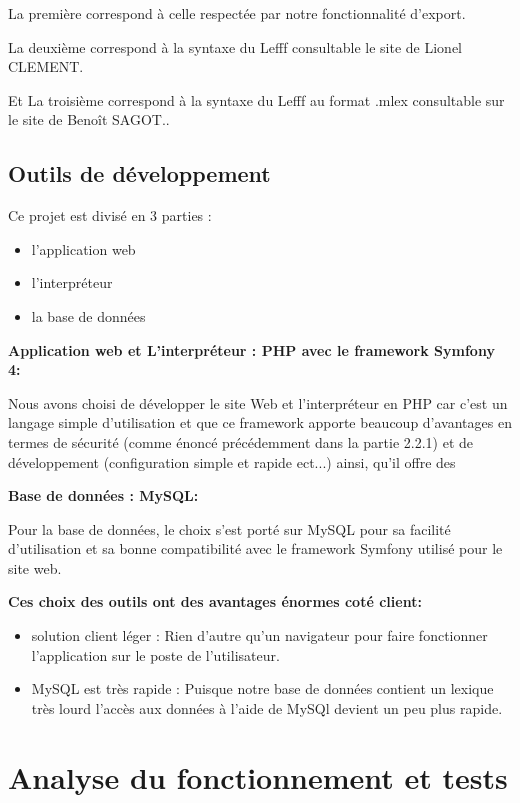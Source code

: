 \documentclass[12pt,a4paper]{article}
\begin{document}
La  première correspond à celle respectée par notre fonctionnalité d'export.




La deuxième  correspond à la syntaxe du Lefff consultable le site de Lionel CLEMENT.



Et La troisième  correspond à la syntaxe du Lefff au format .mlex consultable sur le site de Benoît SAGOT..

						

\subsection{Outils de développement}

Ce projet est divisé en 3 parties :
\begin{itemize}  
  \item l'application web
  \item l'interpréteur
  \item la base de données
\end{itemize}

\textbf{Application web et L'interpréteur : PHP avec le framework Symfony 4:}

Nous avons choisi de développer le site Web et l'interpréteur en PHP car c'est un langage simple d'utilisation et que ce framework apporte beaucoup d'avantages en termes de sécurité (comme énoncé précédemment dans la partie 2.2.1) et de développement (configuration simple et rapide ect...) ainsi, qu'il offre des 

\smallbreak

\textbf{Base de données : MySQL:}


Pour la base de données, le choix s'est porté sur MySQL pour sa facilité d'utilisation et sa bonne compatibilité avec le framework Symfony utilisé pour le site web. 


\textbf{Ces choix des outils ont des avantages énormes coté client:}

\begin{itemize}  
  \item solution client léger : Rien d'autre qu'un navigateur pour faire fonctionner l'application sur le poste de l'utilisateur.
  \item MySQL est très rapide : Puisque notre base de données contient un lexique très lourd l'accès aux données à l'aide de MySQl devient un peu plus rapide.
\end{itemize}

\section{Analyse du fonctionnement et tests}
\end{document}
